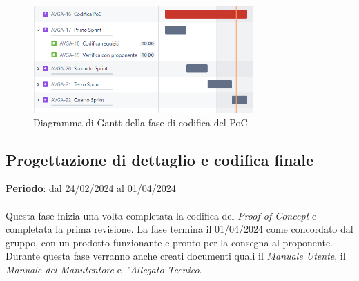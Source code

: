 \begin{figure}[H]
    \centering
    \includegraphics[width=0.75\textwidth]{images/gantt_codRTB.PNG}
    \caption{Diagramma di Gantt della fase di codifica del PoC}
    \label{fig:gantt_codRTB}
\end{figure}


\subsection{Progettazione di dettaglio e codifica finale}\label{sec:pianificazione:progCodifica}

\textbf{Periodo}: dal 24/02/2024 al 01/04/2024\\\\
Questa fase inizia una volta completata la codifica del \textit{Proof of Concept} e completata la prima revisione. La fase termina il 01/04/2024 come concordato dal gruppo, con un prodotto funzionante e pronto per la consegna al proponente. Durante questa fase verranno anche creati documenti quali il \textit{Manuale Utente}, il \textit{Manuale del Manutentore} e l'\textit{Allegato Tecnico}.


